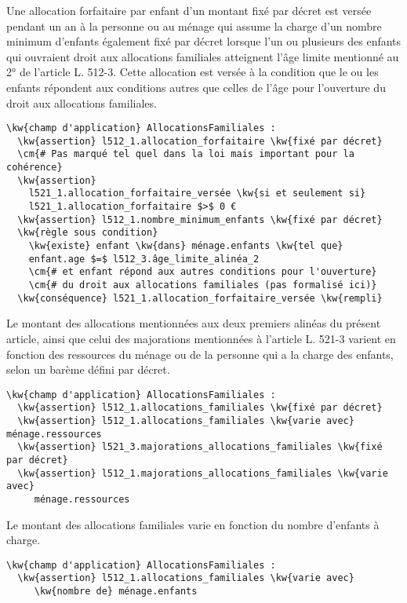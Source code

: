 \documentclass[12pt, french]{article}
\newcommand{\cm}[1]{\textbf{\textcolor{Gray}{#1}}}
\newcommand{\kw}[1]{\textbf{\textcolor{OliveGreen}{#1}}}
\begin{document}
Une allocation forfaitaire par enfant d'un montant fixé par décret est versée pendant un an à la personne ou au ménage qui assume la charge d'un nombre minimum d'enfants également fixé par décret lorsque l'un ou plusieurs des enfants qui ouvraient droit aux allocations familiales atteignent l'âge limite mentionné au 2° de l'article L. 512-3. Cette allocation est versée à la condition que le ou les enfants répondent aux conditions autres que celles de l'âge pour l'ouverture du droit aux allocations familiales.
\begin{Verbatim}
\kw{champ d'application} AllocationsFamiliales :
  \kw{assertion} l512_1.allocation_forfaitaire \kw{fixé par décret}
  \cm{# Pas marqué tel quel dans la loi mais important pour la cohérence}
  \kw{assertion}
    l521_1.allocation_forfaitaire_versée \kw{si et seulement si}
    l521_1.allocation_forfaitaire $>$ 0 €
  \kw{assertion} l512_1.nombre_minimum_enfants \kw{fixé par décret}
  \kw{règle sous condition}
    \kw{existe} enfant \kw{dans} ménage.enfants \kw{tel que}
    enfant.age $=$ l512_3.âge_limite_alinéa_2
    \cm{# et enfant répond aux autres conditions pour l'ouverture}
    \cm{# du droit aux allocations familiales (pas formalisé ici)}
  \kw{conséquence} l521_1.allocation_forfaitaire_versée \kw{rempli}
\end{Verbatim}

Le montant des allocations mentionnées aux deux premiers alinéas du présent article, ainsi que celui des majorations mentionnées à l'article L. 521-3 varient en fonction des ressources du ménage ou de la personne qui a la charge des enfants, selon un barème défini par décret.
\begin{Verbatim}
\kw{champ d'application} AllocationsFamiliales :
  \kw{assertion} l512_1.allocations_familiales \kw{fixé par décret}
  \kw{assertion} l512_1.allocations_familiales \kw{varie avec} ménage.ressources
  \kw{assertion} l521_3.majorations_allocations_familiales \kw{fixé par décret}
  \kw{assertion} l512_1.majorations_allocations_familiales \kw{varie avec}
     ménage.ressources
\end{Verbatim}

Le montant des allocations familiales varie en fonction du nombre d'enfants à charge.

\begin{Verbatim}
\kw{champ d'application} AllocationsFamiliales :
  \kw{assertion} l512_1.allocations_familiales \kw{varie avec}
     \kw{nombre de} ménage.enfants
\end{Verbatim}
\end{document}
